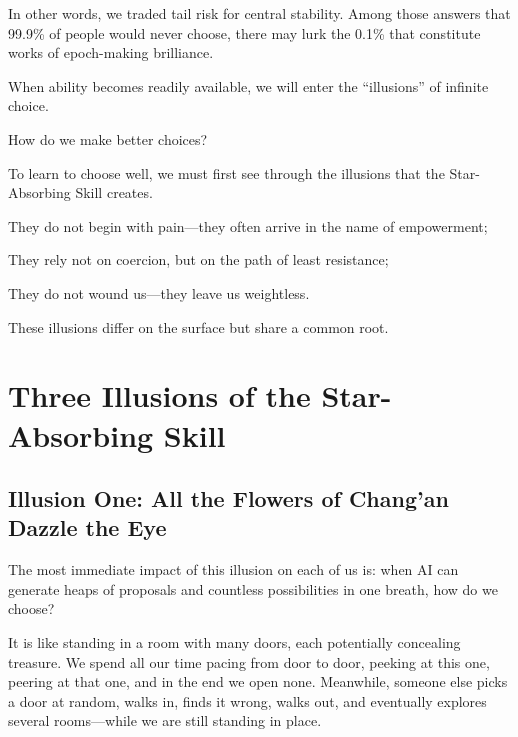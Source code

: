 In other words, we traded tail risk for central stability. Among those answers that 99.9\% of people would never choose, there may lurk the 0.1\% that constitute works of epoch-making brilliance.

\begin{thinkbox}[Reflection]
When ability becomes readily available, we will enter the ``illusions'' of infinite choice.

How do we make better choices?
\end{thinkbox}

To learn to choose well, we must first see through the illusions that the Star-Absorbing Skill creates.

They do not begin with pain---they often arrive in the name of empowerment;

They rely not on coercion, but on the path of least resistance;

They do not wound us---they leave us weightless.

These illusions differ on the surface but share a common root.

\newpage
\section{Three Illusions of the Star-Absorbing Skill}

\subsection{Illusion One: All the Flowers of Chang'an Dazzle the Eye}


The most immediate impact of this illusion on each of us is: when AI can generate heaps of proposals and countless possibilities in one breath, how do we choose?

It is like standing in a room with many doors, each potentially concealing treasure. We spend all our time pacing from door to door, peeking at this one, peering at that one, and in the end we open none. Meanwhile, someone else picks a door at random, walks in, finds it wrong, walks out, and eventually explores several rooms---while we are still standing in place.

